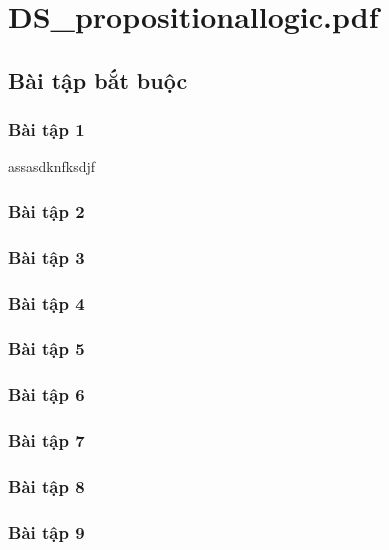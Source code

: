 \documentclass[a4paper]{article}
\begin{document}
\tableofcontents
\newpage
\section{DS\_propositionallogic.pdf}
\subsection{Bài tập bắt buộc}
\subsubsection{Bài tập 1}
assasdknfksdjf

\clearpage
\subsubsection{Bài tập 2}

\clearpage
\subsubsection{Bài tập 3}

\clearpage
\subsubsection{Bài tập 4}

\clearpage
\subsubsection{Bài tập 5}

\clearpage
\subsubsection{Bài tập 6}

\clearpage
\subsubsection{Bài tập 7}

\clearpage
\subsubsection{Bài tập 8}

\clearpage
\subsubsection{Bài tập 9}

\clearpage
\end{document}

